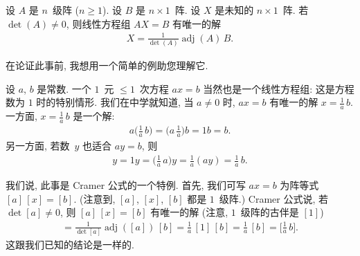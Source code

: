 \begin{theorem}[Cramer 公式, 1]
    设 \(A\) 是 \(n\)~级阵 (\(n \geq 1\)).
    设 \(B\) 是 \(n \times 1\)~阵.
    设 \(X\) 是未知的 \(n \times 1\)~阵.
    若 \(\det {(A)} \neq 0\),
    则线性方程组 \(AX = B\) 有唯一的解
    \begin{align*}
        X = \frac{1}{\det {(A)}} \operatorname{adj} {(A)}\,B.
    \end{align*}
\end{theorem}

在论证此事前, 我想用一个简单的例助您理解它.

\begin{example}
    设 \(a\), \(b\) 是常数.
    一个 \(1\)~元 \({\leq} 1\)~次方程
    \(ax = b\)
    当然也是一个线性方程组:
    这是方程数为 \(1\) 时的特别情形.
    我们在中学就知道, 当 \(a \neq 0\) 时,
    \(ax = b\) 有唯一的解 \(x = \frac{1}{a}\, b\).
    一方面, \(x = \frac{1}{a}\, b\) 是一个解:
    \begin{align*}
        a \Big(\frac{1}{a}\, b \Big)
        = \Big(a\, \frac{1}{a} \Big) b
        = 1b
        = b.
    \end{align*}
    另一方面, 若数~\(y\) 也适合 \(ay = b\), 则
    \begin{align*}
        y
        = 1y
        = \Big(\frac{1}{a}\, a\Big)y
        = \frac{1}{a} (ay)
        = \frac{1}{a}\, b.
    \end{align*}

    我们说, 此事是 Cramer 公式的一个特例.
    首先, 我们可写 \(ax = b\)
    为阵等式 \([a]\, [x] = [b]\).
    (注意到, \([a]\), \([x]\), \([b]\) 都是 \(1\)~级阵.)
    Cramer 公式说, 若 \(\det {[a]} \neq 0\),
    则 \([a]\, [x] = [b]\)
    有唯一的解
    (注意, \(1\)~级阵的古伴是 \([1]\))
    \begin{align*}
        [x] = \frac{1}{\det {[a]}}
        \operatorname{adj} {([a])}\,[b]
        = \frac{1}{a}\, [1]\,[b]
        = \frac{1}{a}\, [b]
        = \Big[ \frac{1}{a}\, b \Big].
    \end{align*}
    这跟我们已知的结论是一样的.
\end{example}

